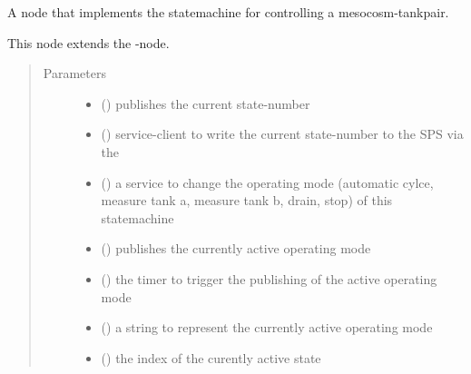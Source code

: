 \documentclass[a4paper,12pt,twoside]{article}
\begin{document}
\begin{fulllineitems}
\label{\detokenize{meso_control_pkg:meso_control_pkg.meso_state_machine.MesoStateMachine}}
A node that implements the statemachine for controlling a mesocosm-tankpair.

This node extends the -node.
\begin{quote}\begin{description}
\item[{Parameters}] \leavevmode\begin{itemize}
\item {} 
 () \textendash{} publishes the current state-number

\item {} 
 () \textendash{} service-client to write the current state-number to the SPS via
the 

\item {} 
 () \textendash{} a service to change the operating mode (automatic cylce, measure
tank a, measure tank b, drain, stop) of this statemachine

\item {} 
 () \textendash{} publishes the currently active operating mode

\item {} 
 () \textendash{} the timer to trigger the publishing of the active operating mode

\item {} 
 () \textendash{} a string to represent the currently active operating mode

\item {} 
 () \textendash{} the index of the curently active state

\end{itemize}

\end{description}\end{quote}

\end{fulllineitems}
\end{document}
